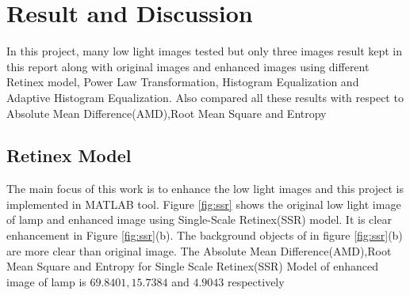 \chapter{Result and Discussion}
In this project, many low light images tested but only three images result kept in this report along with original images and enhanced images using different Retinex model, Power Law Transformation, Histogram Equalization and Adaptive Histogram Equalization. Also compared all these results with respect to Absolute Mean Difference(AMD),Root Mean Square and Entropy
\section{Retinex Model}
The main focus of this work is to enhance the low light images and this project is implemented in MATLAB tool. Figure \ref{fig:ssr} shows the original low light image of lamp and enhanced image using Single-Scale Retinex(SSR) model. It is clear enhancement in Figure \ref{fig:ssr}(b). The background objects of in figure \ref{fig:ssr}(b) are more clear than original image. The Absolute Mean Difference(AMD),Root Mean Square and Entropy for Single Scale Retinex(SSR) Model of enhanced image of lamp is $69.8401,15.7384$ and $4.9043$ respectively      



